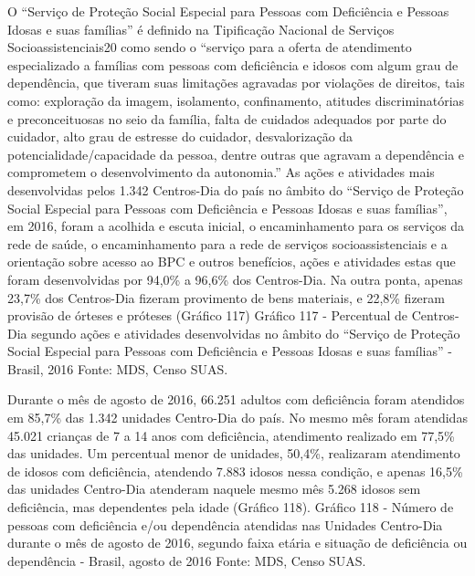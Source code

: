 \documentclass[
  brazilian]{report}
\begin{document}
O ``Serviço de Proteção Social Especial para Pessoas com Deficiência e
Pessoas Idosas e suas famílias'' é definido na Tipificação Nacional de
Serviços Socioassistenciais20 como sendo o ``serviço para a oferta de
atendimento especializado a famílias com pessoas com deficiência e
idosos com algum grau de dependência, que tiveram suas limitações
agravadas por violações de direitos, tais como: exploração da imagem,
isolamento, confinamento, atitudes discriminatórias e preconceituosas no
seio da família, falta de cuidados adequados por parte do cuidador, alto
grau de estresse do cuidador, desvalorização da
potencialidade/capacidade da pessoa, dentre outras que agravam a
dependência e comprometem o desenvolvimento da autonomia.'' As ações e
atividades mais desenvolvidas pelos 1.342 Centros-Dia do país no âmbito
do ``Serviço de Proteção Social Especial para Pessoas com Deficiência e
Pessoas Idosas e suas famílias'', em 2016, foram a acolhida e escuta
inicial, o encaminhamento para os serviços da rede de saúde, o
encaminhamento para a rede de serviços socioassistenciais e a orientação
sobre acesso ao BPC e outros benefícios, ações e atividades estas que
foram desenvolvidas por 94,0\% a 96,6\% dos Centros-Dia. Na outra ponta,
apenas 23,7\% dos Centros-Dia fizeram provimento de bens materiais, e
22,8\% fizeram provisão de órteses e próteses (Gráfico 117) Gráfico 117
- Percentual de Centros-Dia segundo ações e atividades desenvolvidas no
âmbito do ``Serviço de Proteção Social Especial para Pessoas com
Deficiência e Pessoas Idosas e suas famílias'' - Brasil, 2016 Fonte:
MDS, Censo SUAS.

Durante o mês de agosto de 2016, 66.251 adultos com deficiência foram
atendidos em 85,7\% das 1.342 unidades Centro-Dia do país. No mesmo mês
foram atendidas 45.021 crianças de 7 a 14 anos com deficiência,
atendimento realizado em 77,5\% das unidades. Um percentual menor de
unidades, 50,4\%, realizaram atendimento de idosos com deficiência,
atendendo 7.883 idosos nessa condição, e apenas 16,5\% das unidades
Centro-Dia atenderam naquele mesmo mês 5.268 idosos sem deficiência, mas
dependentes pela idade (Gráfico 118). Gráfico 118 - Número de pessoas
com deficiência e/ou dependência atendidas nas Unidades Centro-Dia
durante o mês de agosto de 2016, segundo faixa etária e situação de
deficiência ou dependência - Brasil, agosto de 2016 Fonte: MDS, Censo
SUAS.
\end{document}
